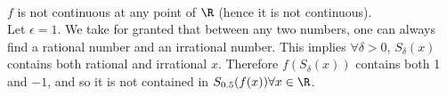 
\begin{solution}
 \\$f$ is not continuous at any point of $\R$ (hence it is not continuous). \\
 Let $\epsilon = 1$. We take for granted that between any two numbers, one can always find a rational number and an irrational number. This implies $\forall \delta > 0$, $S_\delta(x)$ contains both rational and irrational $x$. Therefore $f(S_\delta(x))$ contains both 1 and $-1$, and so it is not contained in $S_{0.5}(f(x)) \forall x \in \R$.
\end{solution}


